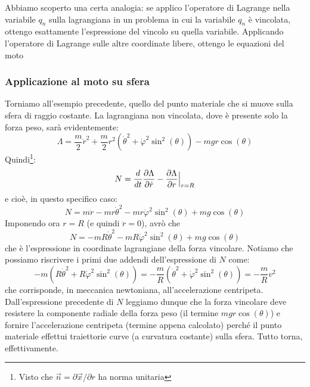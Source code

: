 \documentclass[a4paper,openany]{article}
\begin{document}
	
	Abbiamo scoperto una certa analogia: se applico l'operatore di Lagrange nella variabile $q_n$ sulla lagrangiana in un problema in cui la variabile $q_n$ è vincolata, ottengo esattamente l'espressione del vincolo su quella variabile. Applicando l'operatore di Lagrange sulle altre coordinate libere, ottengo le equazioni del moto
	\subsubsection{Applicazione al moto su sfera}
	Torniamo all'esempio precedente, quello del punto materiale che si muove sulla sfera di raggio costante.
	La lagrangiana non vincolata, dove è presente solo la forza peso, sarà evidentemente:
	$$
	\Lambda =\dfrac{m}{2}\dot{r}^2+ \dfrac{m}{2}r^{2}(\dot{\theta}^{2}+\dot{\varphi}^{2}\sin^{2}(\theta)) - mgr\cos(\theta)
	$$
	Quindi\footnote{Visto che $\vec{n} = \partial\vec{x}/\partial r $ ha norma unitaria}:
	$$
	N =\dfrac{d}{dt}\dfrac{\partial \Lambda}{\partial \dot{r}} - \dfrac{\partial \Lambda}{\partial r}\Bigl|_{r=R}
	$$
	e cioè, in questo specifico caso:
	$$
	N = m\ddot{r}  -mr\dot{\theta}^{2}-mr\dot{\varphi}^{2}\sin^{2}(\theta) + mg\cos(\theta)
	$$
	Imponendo ora $r=R$ (e quindi $\ddot{r}=0$), avrò che
	$$
	N =  -mR\dot{\theta}^{2}-mR\dot{\varphi}^{2}\sin^{2}(\theta) + mg\cos(\theta)
	$$
	che è l'espressione in coordinate lagrangiane della forza vincolare. Notiamo che possiamo riscrivere i primi due addendi dell'espressione di $N$ come:
	$$ -m(R\dot{\theta}^{2}+R\dot{\varphi}^{2}\sin^{2}(\theta))  = -\dfrac{m}{R}(\dot{\theta}^{2}+ \dot{\varphi}^{2}\sin^{2}(\theta)) = -\dfrac{m}{R}v^{2}
	$$
	che corrisponde, in meccanica newtoniana, all'accelerazione centripeta. Dall'espressione precedente di $N$ leggiamo dunque che la forza vincolare deve resistere la componente radiale della forza peso (il termine $mgr\cos(\theta)$) e fornire l'accelerazione centripeta (termine appena calcolato) perché il punto materiale effettui traiettorie curve (a curvatura costante) sulla sfera. Tutto torna, effettivamente.
	
\end{document}
